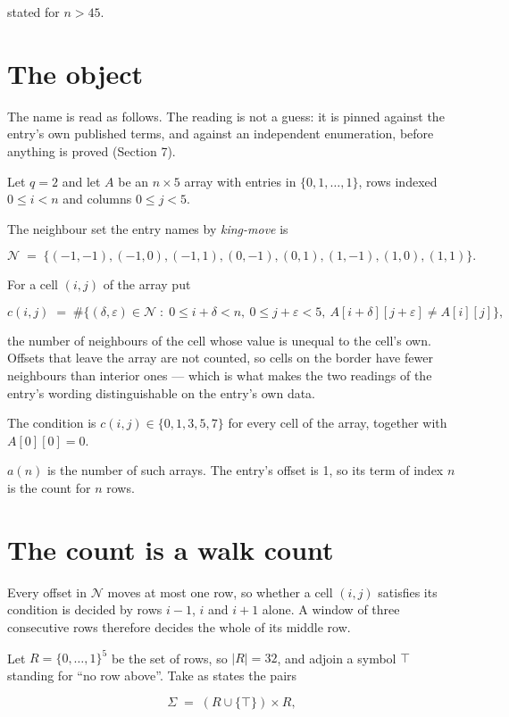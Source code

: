 \documentclass[11pt]{article}
\theoremstyle{definition}
\begin{document}
stated for $n > 45$.

\section{The object}

The name is read as follows. The reading is not a guess: it is pinned against the entry's own published terms, and against an independent enumeration, before anything is proved (Section 7).

Let $q = 2$ and let $A$ be an $n \times 5$ array with entries in $\{0,1,\dots,1\}$, rows indexed $0 \le i < n$ and columns $0 \le j < 5$.

The neighbour set the entry names by {\itshape king-move} is

\[\mathcal{N} \;=\; \{(-1,-1), (-1,0), (-1,1), (0,-1), (0,1), (1,-1), (1,0), (1,1)\}.\]

For a cell $(i,j)$ of the array put

\[c(i,j) \;=\; \#\bigl\{(\delta,\varepsilon)\in\mathcal{N} \;:\; 0\le i+\delta<n,\ 0\le j+\varepsilon<5,\ A[i+\delta][j+\varepsilon] \neq A[i][j]\bigr\},\]

the number of neighbours of the cell whose value is unequal to the cell's own. Offsets that leave the array are not counted, so cells on the border have fewer neighbours than interior ones --- which is what makes the two readings of the entry's wording distinguishable on the entry's own data.

The condition is $c(i,j) \in \{0, 1, 3, 5, 7\}$ for every cell of the array, together with $A[0][0]=0$.

$a(n)$ is the number of such arrays. The entry's offset is 1, so its term of index $n$ is the count for $n$ rows.

\section{The count is a walk count}

Every offset in $\mathcal{N}$ moves at most one row, so whether a cell $(i,j)$ satisfies its condition is decided by rows $i-1$, $i$ and $i+1$ alone. A window of three consecutive rows therefore decides the whole of its middle row.

Let $R = \{0,\dots,1\}^{5}$ be the set of rows, so $|R| = 32$, and adjoin a symbol $\top$ standing for ``no row above''. Take as states the pairs

\[\Sigma \;=\; (R \cup \{\top\}) \times R,\]
\end{document}
